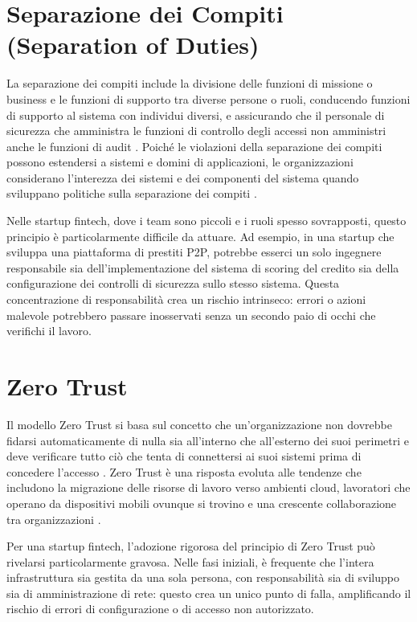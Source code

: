 \section{Separazione dei Compiti (Separation of Duties)}
La separazione dei compiti include la divisione delle funzioni di missione o business e le funzioni di supporto tra diverse persone o ruoli, conducendo funzioni di supporto al sistema con individui diversi, e assicurando che il personale di sicurezza che amministra le funzioni di controllo degli accessi non amministri anche le funzioni di audit \cite{OSCAL_Content}. Poiché le violazioni della separazione dei compiti possono estendersi a sistemi e domini di applicazioni, le organizzazioni considerano l'interezza dei sistemi e dei componenti del sistema quando sviluppano politiche sulla separazione dei compiti \cite{OSCAL_Content}.

Nelle startup fintech, dove i team sono piccoli e i ruoli spesso sovrapposti, questo principio è particolarmente difficile da attuare. Ad esempio, in una startup che sviluppa una piattaforma di prestiti P2P, potrebbe esserci un solo ingegnere responsabile sia dell'implementazione del sistema di scoring del credito sia della configurazione dei controlli di sicurezza sullo stesso sistema. Questa concentrazione di responsabilità crea un rischio intrinseco: errori o azioni malevole potrebbero passare inosservati senza un secondo paio di occhi che verifichi il lavoro.

\section{Zero Trust}
Il modello Zero Trust si basa sul concetto che un'organizzazione non dovrebbe fidarsi automaticamente di nulla sia all'interno che all'esterno dei suoi perimetri e deve verificare tutto ciò che tenta di connettersi ai suoi sistemi prima di concedere l'accesso \cite{NIST_SP_800_207}. Zero Trust è una risposta evoluta alle tendenze che includono la migrazione delle risorse di lavoro verso ambienti cloud, lavoratori che operano da dispositivi mobili ovunque si trovino e una crescente collaborazione tra organizzazioni \cite{NIST_SP_800_207}.

Per una startup fintech, l'adozione rigorosa del principio di Zero Trust può rivelarsi particolarmente gravosa. Nelle fasi iniziali, è frequente che l'intera infrastruttura sia gestita da una sola persona, con responsabilità sia di sviluppo sia di amministrazione di rete: questo crea un unico punto di falla, amplificando il rischio di errori di configurazione o di accesso non autorizzato.

